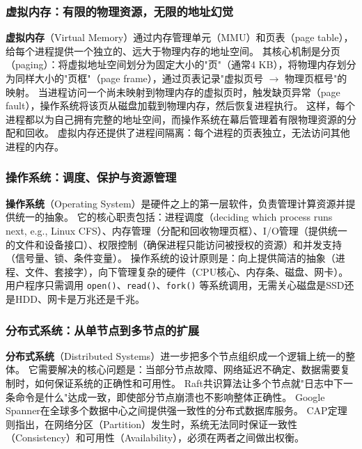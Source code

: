 \subsubsection{虚拟内存：有限的物理资源，无限的地址幻觉}

\textbf{虚拟内存}（Virtual Memory）通过内存管理单元（MMU）和页表（page table），给每个进程提供一个独立的、远大于物理内存的地址空间。
其核心机制是分页（paging）：将虚拟地址空间划分为固定大小的"页"（通常4 KB），将物理内存划分为同样大小的"页框"（page frame），通过页表记录"虚拟页号 $\to$ 物理页框号"的映射。
当进程访问一个尚未映射到物理内存的虚拟页时，触发缺页异常（page fault），操作系统将该页从磁盘加载到物理内存，然后恢复进程执行\cite{ostep_2023}。
这样，每个进程都以为自己拥有完整的地址空间，而操作系统在幕后管理着有限物理资源的分配和回收。
虚拟内存还提供了进程间隔离：每个进程的页表独立，无法访问其他进程的内存。

\subsubsection{操作系统：调度、保护与资源管理}

\textbf{操作系统}（Operating System）是硬件之上的第一层软件，负责管理计算资源并提供统一的抽象。
它的核心职责包括：进程调度（deciding which process runs next, e.g., Linux CFS\cite{linux_cfs_2026}）、内存管理（分配和回收物理页框）、I/O管理（提供统一的文件和设备接口）、权限控制（确保进程只能访问被授权的资源）和并发支持（信号量、锁、条件变量）\cite{ostep_2023,xv6_2022}。
操作系统的设计原则是：向上提供简洁的抽象（进程、文件、套接字），向下管理复杂的硬件（CPU核心、内存条、磁盘、网卡）。
用户程序只需调用 \texttt{open()}、\texttt{read()}、\texttt{fork()} 等系统调用，无需关心磁盘是SSD还是HDD、网卡是万兆还是千兆。

\subsubsection{分布式系统：从单节点到多节点的扩展}

\textbf{分布式系统}（Distributed Systems）进一步把多个节点组织成一个逻辑上统一的整体。
它需要解决的核心问题是：当部分节点故障、网络延迟不确定、数据需要复制时，如何保证系统的正确性和可用性\cite{cap2002}。
Raft共识算法\cite{raft2014}让多个节点就"日志中下一条命令是什么"达成一致，即使部分节点崩溃也不影响整体正确性。
Google Spanner\cite{spanner2012}在全球多个数据中心之间提供强一致性的分布式数据库服务。
CAP定理\cite{cap2002}则指出，在网络分区（Partition）发生时，系统无法同时保证一致性（Consistency）和可用性（Availability），必须在两者之间做出权衡。

